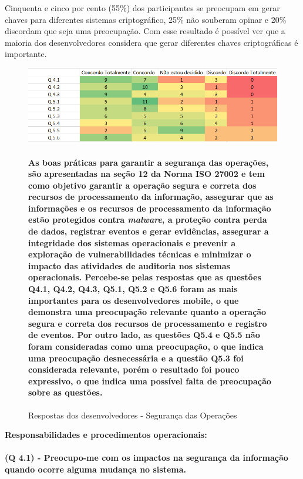 Cinquenta e cinco por cento (55{\%}) dos participantes se preocupam em gerar chaves para diferentes sistemas criptográfico, 25{\%} não souberam opinar e 20{\%} discordam que seja uma preocupação. Com esse resultado é possível ver que a maioria dos desenvolvedores considera que gerar diferentes chaves criptográficas é importante.
 
\begin{figure}[H]
\includegraphics[scale=0.7]{fig/Mapa de calor 3.PNG}
\caption{Respostas dos desenvolvedores - Segurança das Operações }
\label{fig:3}
\paragraph{As boas práticas para garantir a segurança das operações, são apresentadas na seção 12 da Norma ISO 27002 e tem como objetivo garantir a operação segura e correta dos recursos de processamento da informação, assegurar que as informações e os recursos de processamento da informação estão protegidos contra \textit{malware}, a proteção contra perda de dados, registrar eventos e gerar evidências, assegurar a integridade dos sistemas operacionais e prevenir a exploração de vulnerabilidades técnicas e minimizar o impacto das atividades de auditoria nos sistemas operacionais. Percebe-se pelas respostas que as questões Q4.1, Q4.2, Q4.3, Q5.1, Q5.2 e Q5.6 foram as mais importantes para os desenvolvedores mobile, o que demonstra uma preocupação relevante quanto a operação segura e correta dos recursos de processamento e registro de eventos. Por outro lado, as questões  Q5.4 e Q5.5 não foram consideradas como uma preocupação, o que indica uma preocupação desnecessária e a questão Q5.3 foi considerada relevante, porém o resultado foi pouco expressivo, o que indica uma possível falta de preocupação sobre as questões.}
\end{figure}

\noindent\textbf{Responsabilidades e procedimentos operacionais:}
\paragraph{\textbf{(Q 4.1)} - Preocupo-me com os impactos na segurança da informação quando ocorre alguma mudança no sistema.}


